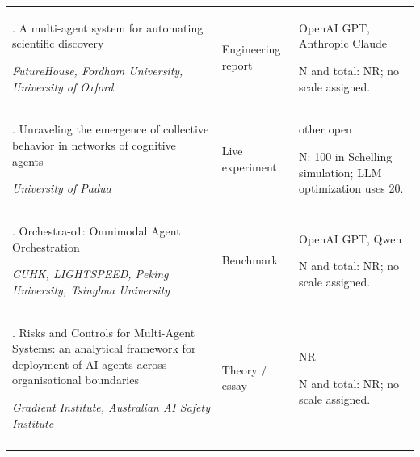 \begin{longtable}{@{}>{\raggedright\arraybackslash}p{}>{\raggedright\arraybackslash}p{}>{\raggedright\arraybackslash}p{}@{}}
150. A multi-agent system for automating scientific discovery \citep{robin-futurehouse}\par\emph{FutureHouse, Fordham University, University of Oxford} & Engineering report & OpenAI GPT, Anthropic Claude\par N and total: NR; no scale assigned. \\ \addlinespace[2pt]
151. Unraveling the emergence of collective behavior in networks of cognitive agents \citep{llm-agent-swarm-optimization}\par\emph{University of Padua} & Live experiment & other open\par N: 100 in Schelling simulation; LLM optimization uses 20. \\ \addlinespace[2pt]
152. Orchestra-o1: Omnimodal Agent Orchestration \citep{orchestra-o1}\par\emph{CUHK, LIGHTSPEED, Peking University, Tsinghua University} & Benchmark & OpenAI GPT, Qwen\par N and total: NR; no scale assigned. \\ \addlinespace[2pt]
153. Risks and Controls for Multi-Agent Systems: an analytical framework for deployment of AI agents across organisational boundaries \citep{au-aisi-mas-risks}\par\emph{Gradient Institute, Australian AI Safety Institute} & Theory / essay & NR\par N and total: NR; no scale assigned. \\ \addlinespace[2pt]
\end{longtable}
\endgroup
